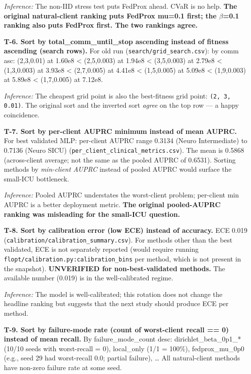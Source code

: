 \documentclass{article}
\begin{document}
\emph{Inference:} The non-IID stress test puts FedProx ahead. CVaR is no help. \textbf{The original natural-client ranking puts FedProx mu=0.1 first; the \ensuremath{\beta}=0.1 ranking also puts FedProx first. The two rankings agree.}


\textbf{T-6. Sort by total\_comm\_until\_stop ascending instead of fitness ascending (search rows).} For old run (\texttt{search/grid\_search.csv}): by comm asc: (2,3,0.01) at 1.60e8 < (2,5,0.003) at 1.94e8 < (3,5,0.003) at 2.79e8 < (1,3,0.003) at 3.93e8 < (2,7,0.005) at 4.41e8 < (1,5,0.005) at 5.09e8 < (1,9,0.003) at 5.89e8 < (1,7,0.005) at 7.12e8.


\emph{Inference:} The cheapest grid point is also the best-fitness grid point: \texttt{(2, 3, 0.01)}. The original sort and the inverted sort \emph{agree} on the top row --- a happy coincidence.


\textbf{T-7. Sort by per-client AUPRC minimum instead of mean AUPRC.} For best validated MLP: per-client AUPRC range 0.3134 (Neuro Intermediate) to 0.7136 (Neuro SICU) (\texttt{per\_client\_clinical\_metrics.csv}). The mean is 0.5868 (across-client average; not the same as the pooled AUPRC of 0.6531). Sorting methods by \emph{min-client AUPRC} instead of pooled AUPRC would surface the small-ICU bottleneck.


\emph{Inference:} Pooled AUPRC understates the worst-client problem; per-client min AUPRC is a better deployment metric. \textbf{The original pooled-AUPRC ranking was misleading for the small-ICU question.}


\textbf{T-8. Sort by calibration error (low ECE) instead of accuracy.} ECE 0.019 (\texttt{calibration/calibration\_summary.csv}). For methods other than the best validated, ECE is not separately reported (would require running \texttt{flopt/calibration.py:calibration\_bins} per method, which is not present in the snapshot). \textbf{UNVERIFIED for non-best-validated methods.} The available number (0.019) is in the well-calibrated regime.


\emph{Inference:} The model is well-calibrated; this rotation does not change the headline ranking but suggests that the next study should produce ECE per method.


\textbf{T-9. Sort by failure-mode rate (count of worst-client recall == 0) instead of mean recall.} By failure\_mode\_count desc: dirichlet\_beta\_0p1\_* (10/10 seeds with worst-recall = 0), local\_only (1/1 = 100\%), fedprox\_mu\_0p0 (e.g., seed 29 had worst-recall 0.0; partial failure), \ldots{} All natural-client methods have non-zero failure rate at some seed.
\end{document}

